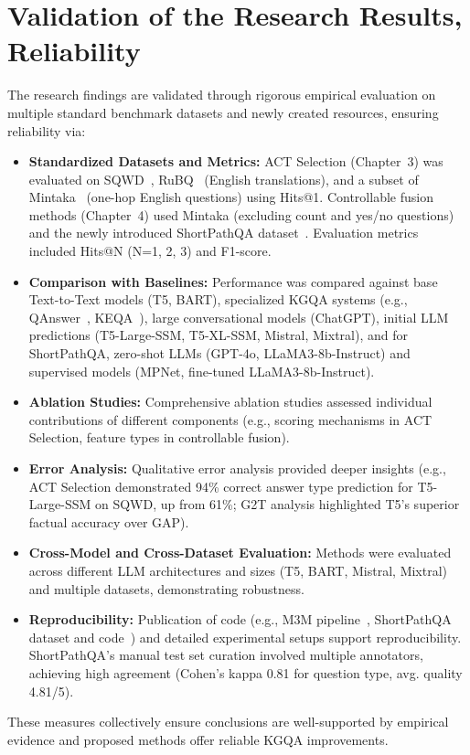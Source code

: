 \section*{Validation of the Research Results, Reliability}
\label{sec:synopsis:validation}
The research findings are validated through rigorous empirical evaluation on multiple standard benchmark datasets and newly created resources, ensuring reliability via:
\begin{itemize}
    \item \textbf{Standardized Datasets and Metrics:} ACT Selection (Chapter~3) was evaluated on SQWD~\cite{SQ_WD}, RuBQ~\cite{korablinov2020rubq} (English translations), and a subset of Mintaka~\cite{DBLP:conf/coling/SenAS22-mintaka} (one-hop English questions) using Hits@1. Controllable fusion methods (Chapter~4) used Mintaka (excluding count and yes/no questions) and the newly introduced ShortPathQA dataset~\cite{DBLP:conf/nldb/SalnikovSPQA25}. Evaluation metrics included Hits@N (N=1, 2, 3) and F1-score.
    \item \textbf{Comparison with Baselines:} Performance was compared against base Text-to-Text models (T5, BART), specialized KGQA systems (e.g., QAnswer~\cite{diefenbach2020towards}, KEQA~\cite{Huang2019KnowledgeGE}), large conversational models (ChatGPT), initial LLM predictions (T5-Large-SSM, T5-XL-SSM, Mistral, Mixtral), and for ShortPathQA, zero-shot LLMs (GPT-4o, LLaMA3-8b-Instruct) and supervised models (MPNet, fine-tuned LLaMA3-8b-Instruct).
    \item \textbf{Ablation Studies:} Comprehensive ablation studies assessed individual contributions of different components (e.g., scoring mechanisms in ACT Selection, feature types in controllable fusion).
    \item \textbf{Error Analysis:} Qualitative error analysis provided deeper insights (e.g., ACT Selection demonstrated 94\% correct answer type prediction for T5-Large-SSM on SQWD, up from 61\%; G2T analysis highlighted T5's superior factual accuracy over GAP).
    \item \textbf{Cross-Model and Cross-Dataset Evaluation:} Methods were evaluated across different LLM architectures and sizes (T5, BART, Mistral, Mixtral) and multiple datasets, demonstrating robustness.
    \item \textbf{Reproducibility:} Publication of code (e.g., M3M pipeline~\cite{DBLP:conf/acl/RazzhigaevSMBP23}, ShortPathQA dataset and code~\cite{DBLP:conf/nldb/SalnikovSPQA25}) and detailed experimental setups support reproducibility. ShortPathQA's manual test set curation involved multiple annotators, achieving high agreement (Cohen's kappa 0.81 for question type, avg. quality 4.81/5).
\end{itemize}
These measures collectively ensure conclusions are well-supported by empirical evidence and proposed methods offer reliable KGQA improvements.

